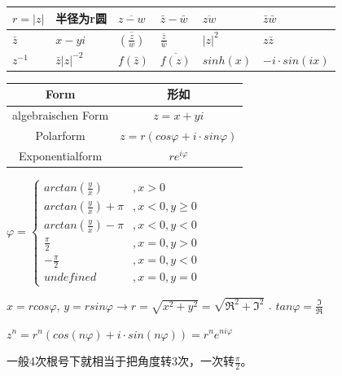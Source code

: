 \documentclass[fleqn]{article}
\begin{document}
\begin{center}
    \begin{tabular}{l|l||l|l||l|l}
        $r=|z|$&半径为r圆&$\overline{z-w}$&$\bar{z}-\bar{w}$&$\overline{zw}$&$\bar{z}\bar{w}$\\
        \hline
        $\bar{z}$&$x-yi$&$\overline{(\frac{z}{w})}$&$\frac{\bar{z}}{\bar{w}}$&$|z|^2$&$z\bar{z}$\\
        \hline
        $z^{-1}$&$\bar{z}|z|^{-2}$&$f(\bar{z})$&$\overline{f(z)}$&$sinh(x)$&$-i\cdot sin(ix)$
    \end{tabular}

    \begin{tabular}{c|c}
        \hline
        Form & 形如 \\
        \hline
        algebraischen Form & $z=x+yi$  \\
        \hline
        Polarform &$z=r(cos\varphi +i\cdot sin\varphi)$\\
        \hline
        Exponentialform & $re^{i\varphi}$\\
        \hline
    \end{tabular}
    $\varphi = \left\{
        \begin{aligned}
            arctan(\frac{y}{x}) &, x>0\\
            arctan(\frac{y}{x})+\pi &, x<0,y\geq 0\\
            arctan(\frac{y}{x})-\pi &, x<0,y<0\\
            \frac{\pi}{2} &, x=0, y>0\\
            -\frac{\pi}{2} &, x=0, y<0\\
            undefined &, x=0, y=0
        \end{aligned}
        \right.$
\end{center}

\qquad $x=rcos\varphi,\, y=rsin\varphi\rightarrow r=\sqrt{x^2+y^2}=\sqrt{\Re^2+\Im^2}$
. $tan\varphi = \frac{\Im}{\Re}$

\qquad $z^n=r^n(cos(n\varphi) + i\cdot sin(n\varphi)) = r^ne^{ni\varphi}$

\qquad 一般4次根号下就相当于把角度转3次，一次转$\frac{\pi}{2}$。
\end{document}
